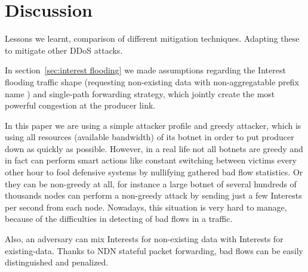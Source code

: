 \section{Discussion}
\label{sec:discussion}

Lessons we learnt, comparison of different mitigation techniques. 
Adapting these to mitigate other DDoS attacks.

In section~\ref{sec:interest flooding} we made assumptions regarding the Interest flooding traffic shape (requesting non-existing data with non-aggregatable prefix name ) and single-path forwarding strategy, which jointly create the most powerful congestion at the producer link. 

In this paper we are using a simple attacker profile and greedy attacker, which is using all resources (available bandwidth) of its botnet in order to put producer down as quickly as possible. However, in a real life not all botnets are greedy and in fact can perform smart actions like constant switching between victims every other hour to fool defensive systems by nullifying gathered bad flow statistics. Or they can be non-greedy at all, for instance a large botnet of several hundreds of thousands nodes can perform a non-greedy attack by sending just a few Interests per second from each node. Nowadays, this situation is very hard to manage, because of the difficulties in detecting of bad flows in a traffic. 

Also, an adversary can mix Interests for non-existing data with Interests for existing-data. Thanks to NDN stateful packet forwarding, bad flows can be easily distinguished and penalized.  

